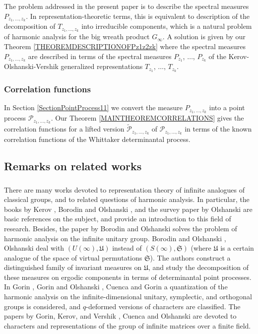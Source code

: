 \documentclass[12pt]{amsart}
\theoremstyle{definition}
\numberwithin{equation}{section}
\begin{document}
The problem
addressed in the present paper is to describe the spectral measures
$P_{z_1,\ldots,z_k}$.  In representation-theoretic terms, this is equivalent to
description of the decomposition of $T_{z_1,\ldots,z_k}$ into irreducible components, which is
 a natural problem of harmonic analysis for the big wreath product $G_{\infty}$.
 A solution is given by our Theorem \ref{THEOREMDESCRIPTIONOFPz1z2zk}
where the  spectral measures
$P_{z_1,\ldots,z_k}$ are described in terms of the spectral measures
$P_{z_1}$, $\ldots$, $P_{z_k}$ of the Kerov-Olshanski-Vershik generalized representations $T_{z_1}$, $\ldots$, $T_{z_k}$.
\subsubsection{Correlation functions}
In Section \ref{SectionPointProcess11} we convert the measure $P_{z_1,\ldots,z_k}$ into a point process $\mathcal{P}_{z_1,\ldots,z_k}$.
Our Theorem \ref{MAINTHEOREMCORRELATIONS} gives the correlation functions for a lifted version
$\widetilde{\mathcal{P}}_{z_1,\ldots,z_k}$ of $\mathcal{P}_{z_1,\ldots,z_k}$ in terms of the known correlation functions of the Whittaker determinantal process.
\subsection{Remarks on related works}
\subsubsection{}
There are many works devoted to representation theory  of infinite analogues of classical groups, and to related questions of harmonic analysis. In particular,
the books by Kerov \cite{KerovDissertation}, Borodin and Olshanski \cite{BorodinOlshanskiBook}, and the survey paper by Olshanski \cite{OlshanskiNato} are basic references on the subject, and provide an introduction to this field of research. Besides,
the paper by Borodin and Olshanski \cite{BorodinOlshanskiUnitary} solves the problem of harmonic analysis on the infinite unitary group.
Borodin and Olshanski \cite{BorodinOlshanskiErgodic}, Olshanski \cite{OlshanskiUnitary} deal with
$\left(U(\infty),\mathfrak{U}\right)$ instead of  $\left(S(\infty),\mathfrak{S}\right)$ (where
$\mathfrak{U}$ is a certain analogue of the space of virtual permutations $\mathfrak{S}$).
The authors construct a distinguished family of invariant measures on $\mathfrak{U}$, and study the decomposition of these measures on ergodic components in terms of determinantal point processes. In Gorin \cite{Gorin}, Gorin and Olshanski \cite{GorinOlshanski}, Cuenca and Gorin \cite{CuencaGorin}  a quantization of the harmonic analysis on the infinite-dimensional unitary, symplectic, and orthogonal groups is considered, and $q$-deformed versions of characters are classified. The  papers by  Gorin, Kerov, and  Vershik \cite{GorinKerovVershik}, Cuenca and Olshanski \cite{CuencaOlshanski1}
are devoted to characters and  representations of the group of infinite matrices over a finite field.
\end{document}
